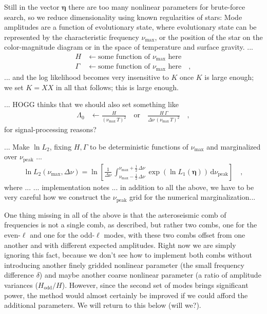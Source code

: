 \documentclass[modern]{aastex63}
\newcommand{\nupeak}{\nu_\mathrm{peak}}
\newcommand{\numax}{\nu_\mathrm{max}}
\newcommand{\dd}{\mathrm{d}}
\renewcommand{\vector}[1]{\boldsymbol{#1}}
\newcommand{\veta}{\vector{\eta}}
\begin{document}
Still in the vector $\veta$ there are too many nonlinear parameters for brute-force
search, so we reduce dimensionality
using known regularities of stars: 
Mode amplitudes are a function of evolutionary
state, where evolutionary state can be represented by the characteristic
frequency $\numax$, or the position of
the star on the color-magnitude diagram or in the space of temperature
and surface gravity.
...
\begin{align}
  H &\leftarrow \mbox{some function of $\numax$ here}
  \\
  \Gamma &\leftarrow \mbox{some function of $\numax$ here}
  \quad ,
\end{align}
... and the log likelihood becomes very insensitive to $K$ once $K$ is large enough;
we set $K=XX$ in all that follows; this is large enough.

... HOGG thinks that we should also set something like
\begin{align}
  \Lambda_0 &\leftarrow \frac{H}{(\numax\,T)^2} \quad\mbox{or}\quad
                        \frac{H\,\Gamma}{\Delta\nu\,(\numax\,T)^2}
  \quad ,
\end{align}
for signal-processing reasons?

... Make $\ln L_2$, fixing $H, \Gamma$ to be deterministic functions of $\numax$
and marginalized over $\nupeak$  ...
\begin{align}
  \ln L_2(\numax,\Delta\nu) = \ln \left[\frac{1}{\Delta\nu}\,\int_{\numax-\frac{1}{2}\,\Delta\nu}^{\numax+\frac{1}{2}\,\Delta\nu} \exp\left(\ln L_1(\veta)\right)\,\dd\nupeak\right]
  \quad ,
\end{align}
where ...
... implementation notes ... in addition to all the above, we have to be
very careful how we construct the $\nupeak$ grid for the numerical marginalization...

One thing missing in all of the above is that the asteroseismic comb of
frequencies is not a single comb, as described, but rather two combs, one
for the even-$\ell$ and one for the odd-$\ell$ modes, with these two combs
offset from one another and with different expected amplitudes.
Right now we are simply ignoring this fact, because we don't see how to
implement both combs without introducing another finely gridded nonlinear
parameter (the small frequency difference $\delta$) and maybe another
coarse nonlinear parameter (a ratio of amplitude variances ($H_{\mathrm{odd}}/H$).
However, since the second set of modes brings significant power,
the method would almost certainly be improved if we could afford the additional
parameters. We will return to this below (will we?).
\end{document}
